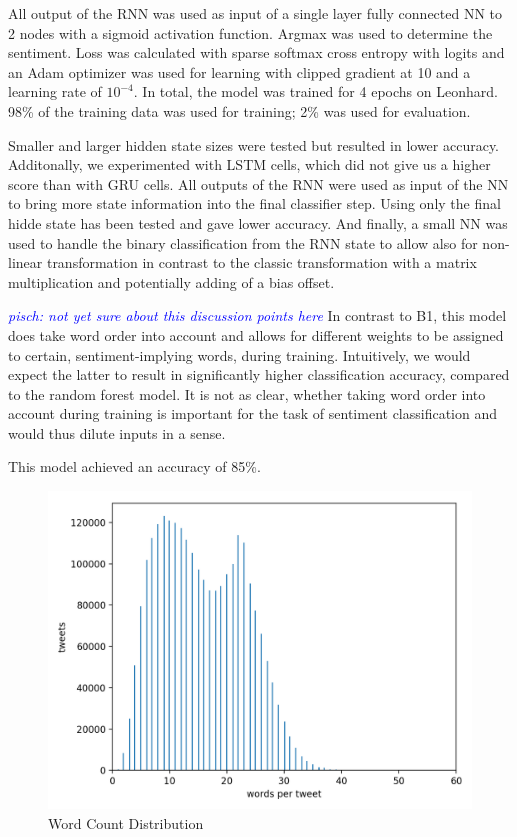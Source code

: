 \documentclass[10pt,conference,compsocconf]{IEEEtran}
\newcommand{\pisch}[1]{\textit{\textcolor{blue}{pisch: #1}}}
\begin{document}
All output of the RNN was used as input of a single layer fully connected NN
to 2 nodes with a sigmoid activation function.
Argmax was used to determine the sentiment.
Loss was calculated with sparse softmax cross entropy with logits and
an Adam optimizer was used for learning with clipped gradient at 10
and a learning rate of $10^{-4}$.
In total, the model was trained for 4 epochs on Leonhard.
98\% of the training data was used for training; 2\% was used for evaluation.

Smaller and larger hidden state sizes were tested but resulted in
lower accuracy. Additonally, we experimented with LSTM cells, which did not give us
a higher score than with GRU cells.
All outputs of the RNN were used as input of the NN to bring more state
information into the final classifier step. Using only the final hidde
state has been tested and gave lower accuracy.
And finally, a small NN was used to handle the binary classification from the RNN 
state to allow also for non-linear transformation in contrast to the classic 
transformation with a matrix multiplication and potentially adding of a
bias offset.

\pisch{not yet sure about this discussion points here}
In contrast to B1, this model does take word order into account
and allows for different weights to be assigned to certain,
sentiment-implying words, during training. Intuitively, we would
expect the latter to result in significantly higher classification
accuracy, compared to the random forest model. It is not as clear,
whether taking word order into account during training is important
for the task of sentiment classification and would thus dilute inputs
in a sense.

This model achieved an accuracy of 85\%.

\begin{figure}[h!]
  \centering
  \includegraphics[scale=0.53]{word_count_histogram.png}
  \caption{Word Count Distribution}
  \label{fig:wordcount}
\end{figure}
\end{document}
